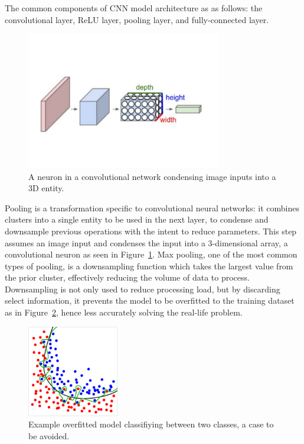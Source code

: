 \documentclass[se,blockletter]{uw-wkrpt}
\begin{document}
The common components of CNN model architecture as as follows: the convolutional layer, ReLU layer, pooling layer, and fully-connected layer.

\begin{figure}
  \centering
  \includegraphics[height=6cm]{convolutional-neuron}
  \caption{A neuron in a convolutional network condensing image inputs into a 3D entity.~\cite{ref:}}
  \label{fig:cnn-neuron}
\end{figure}

Pooling is a transformation specific to convolutional neural networks: it combines clusters into a single entity to be used in the next layer, to condense and downsample previous operations with the intent to reduce parameters. This step assumes an image input and condenses the input into a 3-dimensional array, a convolutional neuron as seen in Figure~\ref{fig:cnn-neuron}. Max pooling, one of the most common types of pooling, is a downsampling function which takes the largest value from the prior cluster, effectively reducing the volume of data to process. Downsampling is not only used to reduce processing load, but by discarding select information, it prevents the model to be overfitted to the training dataset as in Figure~\ref{fig:overfitting}, hence less accurately solving the real-life problem. 

\begin{figure}
  \centering
  \includegraphics[height=4cm]{overfitting}
  \caption{Example overfitted model classifiying between two classes, a case to be avoided.~\cite{ref:}}
  \label{fig:overfitting}
\end{figure}
\end{document}
